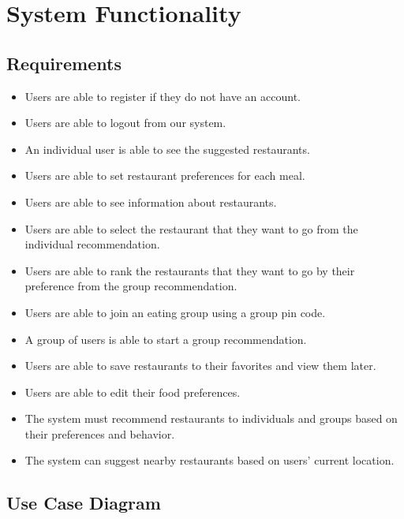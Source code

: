\documentclass[12pt,oneside,openright,a4paper]{cpe-english-project}
\begin{document}
\section{System Functionality}
\subsection{Requirements}
\begin{itemize}
\item Users are able to register if they do not have an account.
\item Users are able to logout from our system.
\item An individual user is able to see the suggested restaurants.
\item Users are able to set restaurant preferences for each meal.
\item Users are able to see information about restaurants.
\item Users are able to select the restaurant that they want to go from the individual recommendation.
\item Users are able to rank the restaurants that they want to go by their preference from the group recommendation.
\item Users are able to join an eating group using a group pin code.
\item A group of users is able to start a group recommendation.
\item Users are able to save restaurants to their favorites and view them later.
\item Users are able to edit their food preferences.
\item The system must recommend restaurants to individuals and groups based on their preferences and behavior.
\item The system can suggest nearby restaurants based on users’ current location.
\end{itemize}


\newpage
\subsection{Use Case Diagram}
\end{document}
